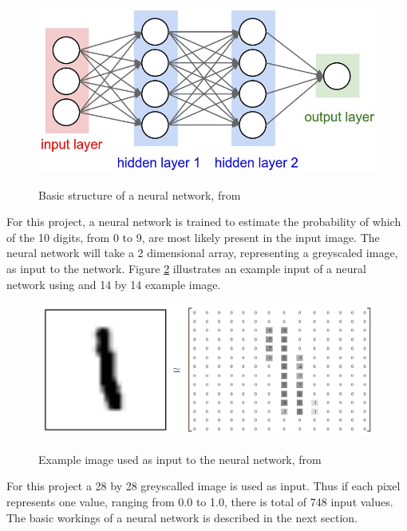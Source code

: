 \begin{figure}
  \centering
  \includegraphics[width=14cm]{NN}\\
  \caption{Basic structure of a neural network, from \citet{karpathy2017}}%
  \label{fig:nn}
\end{figure}

For this project, a neural network is trained to estimate the probability of which of the 10 digits, from 0 to 9, are most likely present in the input image. The neural network will take a 2 dimensional array, representing a greyscaled image, as input to the network. Figure \ref{fig:mnist} illustrates an example input of a neural network using and 14 by 14 example image. 

\begin{figure}
  \centering
  \includegraphics[width=14cm]{MNIST}\\
  \caption{Example image used as input to the neural network, from \citet{tensor2017}}
  \label{fig:mnist}
\end{figure}

For this project a 28 by 28 greyscalled image is used as input. Thus if each pixel represents one value, ranging from 0.0 to 1.0, there is total of 748 input values. The basic workings of a neural network is described in the next section.


